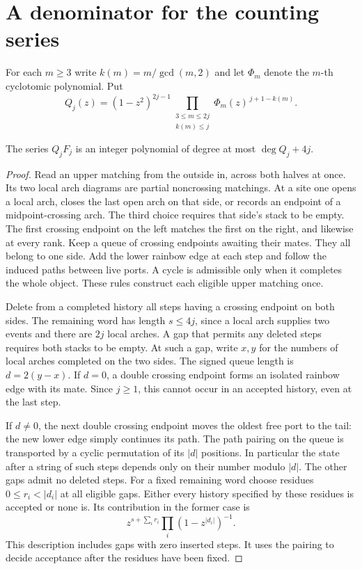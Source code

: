 \section{A denominator for the counting series}
For each \(m\ge3\) write \(k(m)=m/\gcd(m,2)\) and let \(\Phi_m\) denote the \(m\)-th cyclotomic polynomial. Put
\[
 Q_j(z)=(1-z^2)^{2j-1}\!
 \prod_{\substack{3\le m\le 2j\\ k(m)\le j}}\!
 \Phi_m(z)^{\,j+1-k(m)}.
\]
\begin{theorem}\label{thm:bound}
The series \(Q_jF_j\) is an integer polynomial of degree at most \(\deg Q_j+4j\).
\end{theorem}
\begin{proof}
Read an upper matching from the outside in, across both halves at once. Its two local arch diagrams are partial noncrossing matchings. At a site one opens a local arch, closes the last open arch on that side, or records an endpoint of a midpoint-crossing arch. The third choice requires that side's stack to be empty. The first crossing endpoint on the left matches the first on the right, and likewise at every rank. Keep a queue of crossing endpoints awaiting their mates. They all belong to one side. Add the lower rainbow edge at each step and follow the induced paths between live ports. A cycle is admissible only when it completes the whole object. These rules construct each eligible upper matching once.

Delete from a completed history all steps having a crossing endpoint on both sides. The remaining word has length \(s\le4j\), since a local arch supplies two events and there are \(2j\) local arches. A gap that permits any deleted steps requires both stacks to be empty. At such a gap, write \(x,y\) for the numbers of local arches completed on the two sides. The signed queue length is \(d=2(y-x)\). If \(d=0\), a double crossing endpoint forms an isolated rainbow edge with its mate. Since \(j\ge1\), this cannot occur in an accepted history, even at the last step.

If \(d\ne0\), the next double crossing endpoint moves the oldest free port to the tail: the new lower edge simply continues its path. The path pairing on the queue is transported by a cyclic permutation of its \(|d|\) positions. In particular the state after a string of such steps depends only on their number modulo \(|d|\). The other gaps admit no deleted steps. For a fixed remaining word choose residues \(0\le r_i<|d_i|\) at all eligible gaps. Either every history specified by these residues is accepted or none is. Its contribution in the former case is
\[
 z^{s+\sum_i r_i}\prod_i(1-z^{|d_i|})^{-1}.
\]
This description includes gaps with zero inserted steps. It uses the pairing to decide acceptance after the residues have been fixed.


\end{proof}
